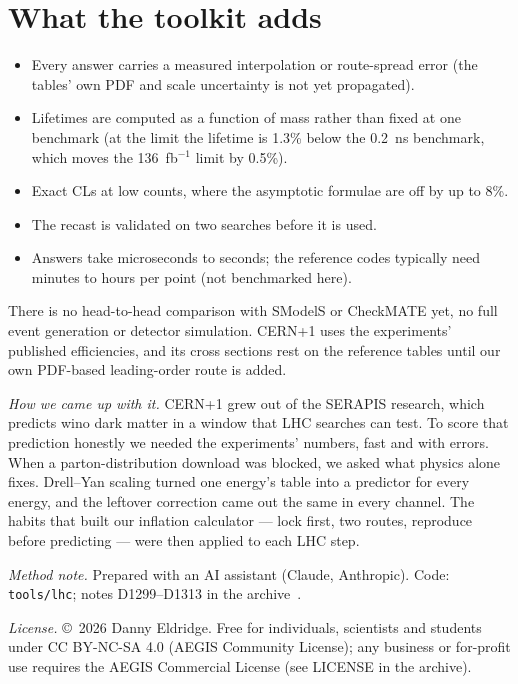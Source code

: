 \documentclass[aps,prd,twocolumn,superscriptaddress,nofootinbib,showkeys]{revtex4-2}
\begin{document}
\section{What the toolkit adds}
\begin{itemize}
\item Every answer carries a measured interpolation or route-spread error (the tables' own PDF and scale uncertainty is not yet propagated).
\item Lifetimes are computed as a function of mass rather than fixed at one benchmark (at the limit the lifetime is 1.3\% below the 0.2~ns benchmark, which moves the 136~fb$^{-1}$ limit by 0.5\%).
\item Exact CLs at low counts, where the asymptotic formulae are off by up to 8\%.
\item The recast is validated on two searches before it is used.
\item Answers take microseconds to seconds; the reference codes typically need minutes to hours per point (not benchmarked here).
\end{itemize}
There is no head-to-head comparison with SModelS or CheckMATE yet, no full event generation or detector simulation. CERN+1 uses the experiments' published efficiencies, and its cross sections rest on the reference tables until our own PDF-based leading-order route is added.

\emph{How we came up with it.}
CERN+1 grew out of the SERAPIS research, which predicts wino dark matter in a window that LHC searches can test. To score that prediction honestly we needed the experiments' numbers, fast and with errors. When a parton-distribution download was blocked, we asked what physics alone fixes. Drell--Yan scaling turned one energy's table into a predictor for every energy, and the leftover correction came out the same in every channel. The habits that built our inflation calculator --- lock first, two routes, reproduce before predicting --- were then applied to each LHC step.

\emph{Method note.} Prepared with an AI assistant (Claude, Anthropic). Code: \texttt{tools/lhc}; notes D1299--D1313 in the archive~\cite{AEGIS}.

\emph{License.} \copyright~2026 Danny Eldridge. Free for individuals, scientists and students under CC BY-NC-SA 4.0 (AEGIS Community License); any business or for-profit use requires the AEGIS Commercial License (see LICENSE in the archive).
\end{document}
